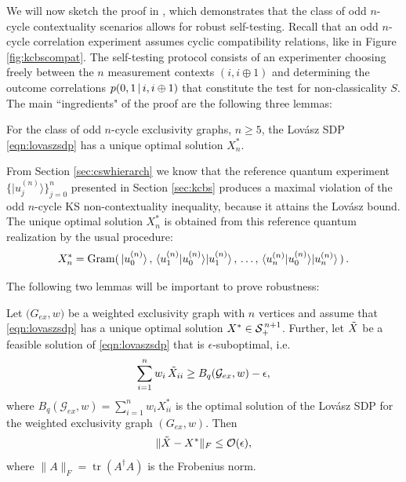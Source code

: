 We will now sketch the proof in \cite{Bharti2019}, which demonstrates that the class of odd $n$-cycle contextuality scenarios allows for robust self-testing. Recall that an odd $n$-cycle correlation experiment assumes cyclic compatibility relations, like in Figure \ref{fig:kcbscompat}. The self-testing protocol consists of an experimenter choosing freely between the $n$ measurement contexts $(i,i\oplus1)$ and determining the outcome correlations $p(0,1\thinspace\vert\thinspace i,i\oplus 1)$ that constitute the test for non-classicality $S$. The main ``ingredients" of the proof are the following three lemmas:

\begin{lemma}
\label{lem:kcbsunique}
For the class of odd $n$-cycle exclusivity graphs, $n\geq5$, the Lovász SDP \ref{eqn:lovaszsdp} has a unique optimal solution $X^*_n$.   
\end{lemma}

From Section \ref{sec:cswhierarch} we know that the reference quantum experiment $\{\vert u_j^{(n)} \rangle \}_{j=0}^{n}$ presented in Section \ref{sec:kcbs} produces a maximal violation of the odd $n$-cycle KS non-contextuality inequality, because it attains the Lovász bound. The unique optimal solution $X^*_n$ is obtained from this reference quantum realization by the usual procedure:
\begin{equation*}
    X^*_n=\operatorname{Gram}(\thinspace\vert u_0^{(n)} \rangle\thinspace,\thinspace \langle u_1^{(n)} \vert u_0^{(n)} \rangle \vert u_1^{(n)} \rangle\thinspace,\thinspace\dots,\thinspace \langle u_n^{(n)} \vert u_0^{(n)} \rangle \vert u_n^{(n)} \rangle\thinspace)\thinspace.
\end{equation*}

The following two lemmas will be important to prove robustness:

\begin{lemma}
\label{lem:epssuboptgram}
Let $\mathcal({G}_{ex},w)$ be a weighted exclusivity graph with $n$ vertices and assume that \ref{eqn:lovaszsdp} has a unique optimal solution $X^*\in \mathcal{S}_+^{\thinspace n+1}$. Further, let $\Tilde{X}$ be a feasible solution of \ref{eqn:lovaszsdp} that is $\epsilon$-suboptimal, i.e.\
\begin{equation*}
    \sum_{i=1}^n w_i\thinspace\Tilde{X}_{ii} \geq B_{q}(\mathcal{G}_{ex},w)-\epsilon,
\end{equation*}
where $B_{q}(\mathcal{G}_{ex},w)=\sum_{i=1}^n w_i X_{ii}^*$ is the optimal solution of the Lovász SDP for the weighted exclusivity graph $({G}_{ex},w)$.
Then
\begin{equation*}
\|\Tilde{X}-X^*\|_F \leq \mathcal{O}(\epsilon),
\end{equation*}
where $\|A\|_F=\operatorname{tr}(A^{\dag}A)$ is the Frobenius norm.
\end{lemma}

